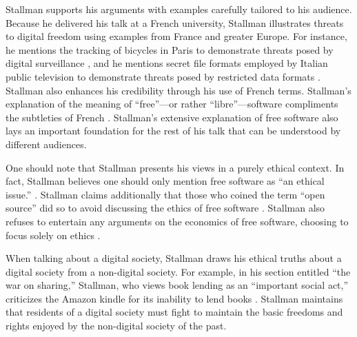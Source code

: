 Stallman supports his arguments with examples carefully tailored to his audience. Because he delivered his talk at a French university, Stallman illustrates threats to digital freedom using examples from France and greater Europe. For instance, he mentions the tracking of bicycles in Paris to demonstrate threats posed by digital surveillance \citeyear[para. 8]{rms}, and he mentions secret file formats employed by Italian public television to demonstrate threats posed by restricted data formats \citeyear[para. 30]{rms}. Stallman also enhances his credibility through his use of French terms. Stallman's explanation of the meaning of “free”—or rather “libre”—software compliments the subtleties of French \citeyear[para. 34]{rms}. Stallman's extensive explanation of free software also lays an important foundation for the rest of his talk that can be understood by different audiences. 	
	
One should note that Stallman presents his views in a purely ethical context. In fact, Stallman believes one should only mention free software as “an ethical issue.” \citeyear[para. 63]{rms}. Stallman claims additionally that those who coined the term “open source” did so to avoid discussing the ethics of free software \citeyear[para. 52]{rms}. Stallman also refuses to entertain any arguments on the economics of free software, choosing to focus solely on ethics \citeyear[para. 34]{rms}. 
	
When talking about a digital society, Stallman draws his ethical truths about a digital society from a non-digital society. For example, in his section entitled “the war on sharing,” Stallman, who views book lending as an “important social act,” criticizes the Amazon kindle for its inability to lend books \citeyear[para. 98]{rms}. Stallman maintains that residents of a digital society must fight to maintain the basic freedoms and rights enjoyed by the non-digital society of the past.


